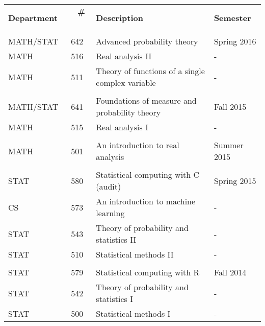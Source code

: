 \documentclass[11pt,a4paper,sans]{moderncv}        %
\begin{document}
\begin{tabularx}{\textwidth}{lcXl}
  \textbf{Department} & \ \ \textbf{\#} \ \ & \textbf{Description} & \textbf{Semester} \\
  \\
  MATH/STAT & 642 & Advanced probability theory & Spring 2016 \\
  MATH & 516 & Real analysis II & - \\
  MATH & 511 & Theory of functions of a single complex variable  & - \\
  \\
  MATH/STAT & 641 & Foundations of measure and probability theory & Fall 2015 \\
  MATH & 515 & Real analysis I & - \\
  \\
  MATH & 501 & An introduction to real analysis & Summer 2015 \\
  \\
  STAT & 580 & Statistical computing with C (audit) & Spring 2015 \\
  CS & 573 & An introduction to machine learning & - \\
  STAT & 543 & Theory of probability and statistics II & - \\
  STAT & 510 & Statistical methods II & - \\
  \\
  STAT & 579 & Statistical computing with R & Fall 2014 \\
  STAT & 542 & Theory of probability and statistics I & - \\
  STAT & 500 & Statistical methods I & - \\
\end{tabularx}
\end{document}
